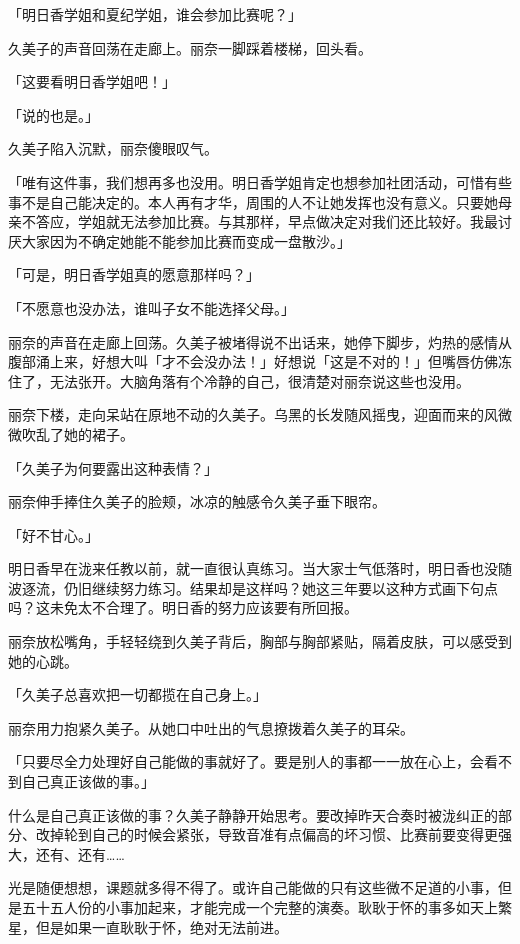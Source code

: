 \documentclass[UTF8]{ctexart}
\begin{document}
    「明日香学姐和夏纪学姐，谁会参加比赛呢？」 

    久美子的声音回荡在走廊上。丽奈一脚踩着楼梯，回头看。 

    「这要看明日香学姐吧！」 

    「说的也是。」 

    久美子陷入沉默，丽奈傻眼叹气。 

    「唯有这件事，我们想再多也没用。明日香学姐肯定也想参加社团活动，可惜有些事不是自己能决定的。本人再有才华，周围的人不让她发挥也没有意义。只要她母亲不答应，学姐就无法参加比赛。与其那样，早点做决定对我们还比较好。我最讨厌大家因为不确定她能不能参加比赛而变成一盘散沙。」 

    「可是，明日香学姐真的愿意那样吗？」 

    「不愿意也没办法，谁叫子女不能选择父母。」 

    丽奈的声音在走廊上回荡。久美子被堵得说不出话来，她停下脚步，灼热的感情从腹部涌上来，好想大叫「才不会没办法！」好想说「这是不对的！」但嘴唇仿佛冻住了，无法张开。大脑角落有个冷静的自己，很清楚对丽奈说这些也没用。 

    丽奈下楼，走向呆站在原地不动的久美子。乌黑的长发随风摇曳，迎面而来的风微微吹乱了她的裙子。 

    「久美子为何要露出这种表情？」 

    丽奈伸手捧住久美子的脸颊，冰凉的触感令久美子垂下眼帘。 

    「好不甘心。」 

    明日香早在泷来任教以前，就一直很认真练习。当大家士气低落时，明日香也没随波逐流，仍旧继续努力练习。结果却是这样吗？她这三年要以这种方式画下句点吗？这未免太不合理了。明日香的努力应该要有所回报。 

    丽奈放松嘴角，手轻轻绕到久美子背后，胸部与胸部紧贴，隔着皮肤，可以感受到她的心跳。 

    「久美子总喜欢把一切都揽在自己身上。」 

    丽奈用力抱紧久美子。从她口中吐出的气息撩拨着久美子的耳朵。 

    「只要尽全力处理好自己能做的事就好了。要是别人的事都一一放在心上，会看不到自己真正该做的事。」 

    什么是自己真正该做的事？久美子静静开始思考。要改掉昨天合奏时被泷纠正的部分、改掉轮到自己的时候会紧张，导致音准有点偏高的坏习惯、比赛前要变得更强大，还有、还有…… 

    光是随便想想，课题就多得不得了。或许自己能做的只有这些微不足道的小事，但是五十五人份的小事加起来，才能完成一个完整的演奏。耿耿于怀的事多如天上繁星，但是如果一直耿耿于怀，绝对无法前进。 
\end{document}
